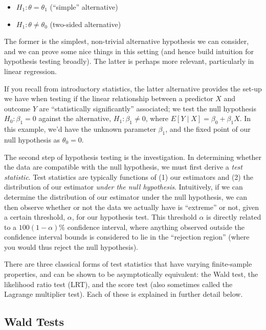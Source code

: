 \documentclass[
  letterpaper,
  DIV=11,
  numbers=noendperiod]{scrreprt}
\begin{document}
\begin{itemize}
\item
  \(H_1: \theta = \theta_1\) (``simple'' alternative)
\item
  \(H_1: \theta \neq \theta_0\) (two-sided alternative)
\end{itemize}

The former is the simplest, non-trivial alternative hypothesis we can
consider, and we can prove some nice things in this setting (and hence
build intuition for hypothesis testing broadly). The latter is perhaps
more relevant, particularly in linear regression.

If you recall from introductory statistics, the latter alternative
provides the set-up we have when testing if the linear relationship
between a predictor \(X\) and outcome \(Y\) are ``statistically
significantly'' associated; we test the null hypothesis
\(H_0: \beta_1 = 0\) against the alternative, \(H_1: \beta_1 \neq 0\),
where \(E[Y \mid X] = \beta_0 + \beta_1 X\). In this example, we'd have
the unknown parameter \(\beta_1\), and the fixed point of our null
hypothesis as \(\theta_0 = 0\).

The second step of hypothesis testing is the investigation. In
determining whether the data are compatible with the null hypothesis, we
must first derive a \emph{test statistic}. Test statistics are typically
functions of (1) our estimators and (2) the distribution of our
estimator \emph{under the null hypothesis}. Intuitively, if we can
determine the distribution of our estimator under the null hypothesis,
we can then observe whether or not the data we actually have is
``extreme'' or not, given a certain threshold, \(\alpha\), for our
hypothesis test. This threshold \(\alpha\) is directly related to a
\(100(1 - \alpha)\%\) confidence interval, where anything observed
outside the confidence interval bounds is considered to lie in the
``rejection region'' (where you would thus reject the null hypothesis).

There are three classical forms of test statistics that have varying
finite-sample properties, and can be shown to be asymptotically
equivalent: the Wald test, the likelihood ratio test (LRT), and the
score test (also sometimes called the Lagrange multiplier test). Each of
these is explained in further detail below.

\subsection*{Wald Tests}\label{wald-tests}
\end{document}
